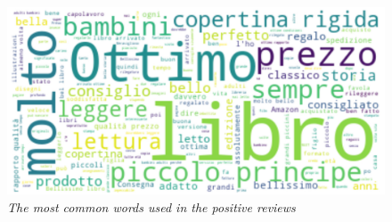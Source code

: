 \documentclass[a4paper,12pt]{article}
\begin{document}
\begin{figure}[H]
	\centering
	\includegraphics[width=0.9\linewidth]{img/good_words.jpg}
	\caption{\textit{The most common words used in the positive reviews}}
\end{figure}
\end{document}
